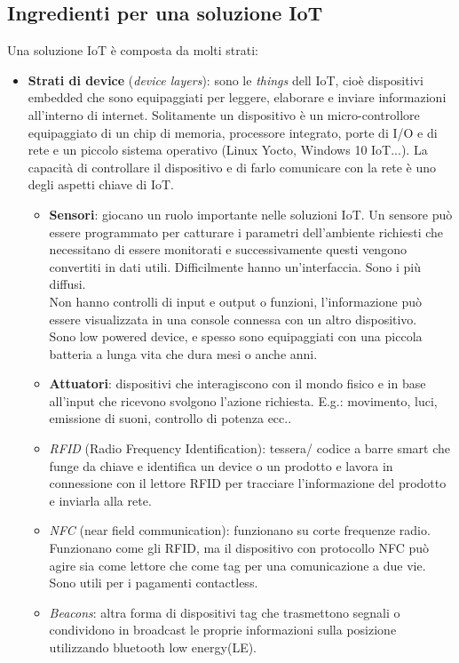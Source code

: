 \documentclass[a4paper]{article}
\theoremstyle{definition}
\begin{document}
		\subsection{Ingredienti per una soluzione IoT}
			Una soluzione IoT è composta da molti strati:
			\begin{itemize}
				\item \textbf{Strati di device} (\textit{device layers}): sono le \textit{things} dell IoT, cioè dispositivi embedded che sono equipaggiati per leggere, elaborare e inviare informazioni all'interno di internet. Solitamente un dispositivo è un micro-controllore equipaggiato di un chip di memoria, processore integrato, porte di I/O e di rete e un piccolo sistema operativo (Linux Yocto, Windows 10 IoT...). La capacità di controllare il dispositivo e di farlo comunicare con la rete è uno degli aspetti chiave di IoT.
				\begin{itemize}
					\item \textbf{Sensori}: giocano un ruolo importante nelle soluzioni IoT. Un sensore può essere programmato per catturare i parametri dell'ambiente richiesti che necessitano di essere monitorati e successivamente questi vengono convertiti in dati utili. Difficilmente hanno un'interfaccia. Sono i più diffusi.\\
					Non hanno controlli di input e output o funzioni, l'informazione può essere visualizzata in una console connessa con un altro dispositivo.\\
					Sono low powered device, e spesso sono equipaggiati con una piccola batteria a lunga vita che dura mesi o anche anni.
					\item \textbf{Attuatori}: dispositivi che interagiscono con il mondo fisico e in base all'input che ricevono svolgono l'azione richiesta. E.g.: movimento, luci, emissione di suoni, controllo di potenza ecc..
					\item \textit{RFID} (Radio Frequency Identification): tessera/ codice a barre smart che funge da chiave e identifica un device o un prodotto e lavora in connessione con il lettore RFID per tracciare l'informazione del prodotto e inviarla alla rete.
					\item \textit{NFC} (near field communication): funzionano su corte frequenze radio. Funzionano come gli RFID, ma il dispositivo con protocollo NFC può agire sia come lettore che come tag per una comunicazione a due vie. Sono utili per i pagamenti contactless.
					\item \textit{Beacons}: altra forma di dispositivi tag che trasmettono segnali o condividono in broadcast le proprie informazioni sulla posizione utilizzando bluetooth low energy(LE).

\end{itemize}
\end{itemize}
\end{document}
